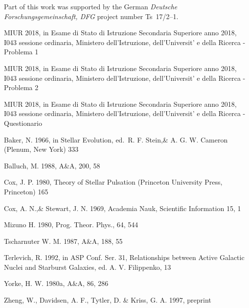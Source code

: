 \documentclass{layout}
\begin{document}
\begin{acknowledgements}
      Part of this work was supported by the German
      \emph{Deut\-sche For\-schungs\-ge\-mein\-schaft, DFG\/} project
      number Ts~17/2--1.
\end{acknowledgements}



\begin{thebibliography}{}

   MIUR 2018,
      in Esame di Stato di Istruzione Secondaria Superiore anno 2018,
      I043 sessione ordinaria,
      Ministero dell'Istruzione, dell'Universit\a' e della Ricerca - Problema 1

   MIUR 2018,
      in Esame di Stato di Istruzione Secondaria Superiore anno 2018,
      I043 sessione ordinaria,
      Ministero dell'Istruzione, dell'Universit\a' e della Ricerca - Problema 2

   MIUR 2018,
      in Esame di Stato di Istruzione Secondaria Superiore anno 2018,
      I043 sessione ordinaria,
      Ministero dell'Istruzione, dell'Universit\a' e della Ricerca - Questionario

   Baker, N. 1966,
      in Stellar Evolution,
      ed.\ R. F. Stein,\& A. G. W. Cameron
      (Plenum, New York) 333

    Balluch, M. 1988,
      A\&A, 200, 58

    Cox, J. P. 1980,
      Theory of Stellar Pulsation
      (Princeton University Press, Princeton) 165

    Cox, A. N.,\& Stewart, J. N. 1969,
      Academia Nauk, Scientific Information 15, 1

    Mizuno H. 1980,
      Prog. Theor. Phys., 64, 544
   
    Tscharnuter W. M. 1987,
      A\&A, 188, 55
  
    Terlevich, R. 1992, in ASP Conf. Ser. 31, 
      Relationships between Active Galactic Nuclei and Starburst Galaxies, 
      ed. A. V. Filippenko, 13

    Yorke, H. W. 1980a,
      A\&A, 86, 286

    Zheng, W., Davidsen, A. F., Tytler, D. \& Kriss, G. A.
      1997, preprint
\end{thebibliography}
\end{document}
